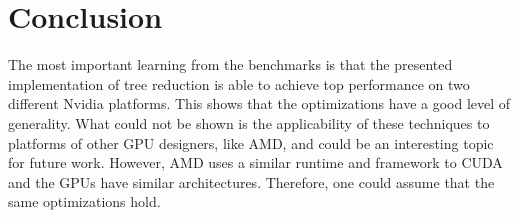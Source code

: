 \section{Conclusion}
The most important learning from the benchmarks is that the presented implementation of tree reduction is able to achieve top performance on two different Nvidia platforms.
This shows that the optimizations have a good level of generality. 
What could not be shown is the applicability of these techniques to platforms of other GPU designers, like AMD, and could be an interesting topic for future work.
However, AMD uses a similar runtime and framework to CUDA and the GPUs have similar architectures.
Therefore, one could assume that the same optimizations hold.
